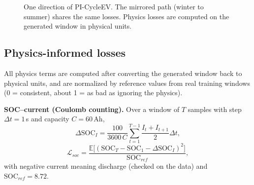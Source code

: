 \documentclass[conference]{IEEEtran}
\begin{document}
\begin{figure}[t]
\centering
{}
\caption{One direction of PI-CycleEV. The mirrored path (winter to summer) shares the same losses. Physics losses are computed on the generated window in physical units.}
\label{fig:pipe}
\end{figure}

\subsection{Physics-informed losses}
All physics terms are computed after converting the generated window back to physical units, and are normalized by reference values from real training windows (0 = consistent, about 1 = as bad as ignoring the physics).

\textbf{SOC--current (Coulomb counting).} Over a window of $T$ samples with step $\Delta t=1$\,s and capacity $C=60$\,Ah,
\begin{equation}
\Delta \mathrm{SOC}_I=\frac{100}{3600\,C}\sum_{t=1}^{T-1}\frac{I_t+I_{t+1}}{2}\Delta t,
\end{equation}
\begin{equation}
\mathcal{L}_{soc}=\frac{\mathbb{E}\big[(\mathrm{SOC}_T-\mathrm{SOC}_1-\Delta \mathrm{SOC}_I)^2\big]}{\mathrm{SOC}_{ref}},
\end{equation}
with negative current meaning discharge (checked on the data) and $\mathrm{SOC}_{ref}=8.72$.
\end{document}
